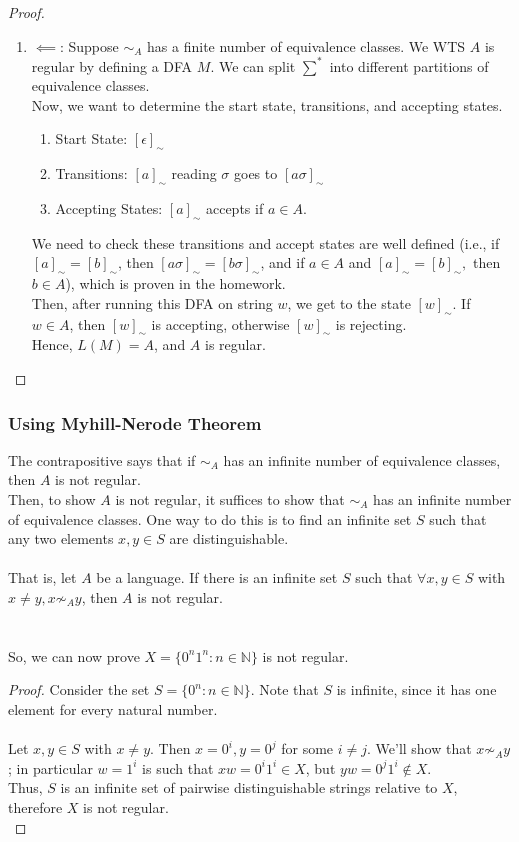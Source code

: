 \documentclass{article}
\begin{document}
\begin{proof}
\begin{enumerate}
        \item $\impliedby$: Suppose $\sim_A$ has a finite number of equivalence classes. We WTS $A$ is regular by defining a DFA $M$. We can split $\sum^*$ into different partitions of equivalence classes.\\
        Now, we want to determine the start state, transitions, and accepting states.
        \begin{enumerate}
            \item Start State: $[\epsilon]_\sim$
            \item Transitions: $[a]_\sim$ reading $\sigma$ goes to $[a\sigma]_\sim$
            \item Accepting States: $[a]_\sim$ accepts if $a \in A$.
        \end{enumerate}
        We need to check these transitions and accept states are well defined (i.e., if $[a]_\sim = [b]_\sim$, then $[a\sigma]_\sim = [b\sigma]_\sim$, and if $a \in A$ and $[a]_\sim = [b]_\sim,$ then $b \in A$), which is proven in the homework.\\
        Then, after running this DFA on string $w$, we get to the state $[w]_\sim$. If $w \in A$, then $[w]_\sim$ is accepting, otherwise $[w]_\sim$ is rejecting.\\
        Hence, $L(M) = A$, and $A$ is regular.
    \end{enumerate}
    \end{proof}
    
    \subsubsection{Using Myhill-Nerode Theorem}
    The contrapositive says that if $\sim_A$ has an infinite number of equivalence classes, then $A$ is not regular.\\
    Then, to show $A$ is not regular, it suffices to show that $\sim_A$ has an infinite number of equivalence classes. One way to do this is to find an infinite set $S$ such that any two elements $x,y \in S$ are distinguishable.\\
    \\
    That is, let $A$ be a language. If there is an infinite set $S$ such that $\forall x,y \in S$ with $x \neq y, x \not\sim_A y$, then $A$ is not regular.\\
    \\
    \\
    So, we can now prove $X = \{0^n1^n: n \in \mathbb{N}\}$ is not regular.
    \begin{proof}
    Consider the set $S = \{0^n: n \in \mathbb{N}\}$. Note that $S$ is infinite, since it has one element for every natural number.\\
    \\
    Let $x,y \in S$ with $x \neq y$. Then $x = 0^i, y = 0^j$ for some $i \neq j$. We'll show that $x \not\sim_A y$; in particular $w = 1^i$ is such that $xw = 0^i1^i \in X$, but $yw = 0^j1^i \not\in X$.\\
    Thus, $S$ is an infinite set of pairwise distinguishable strings relative to $X$, therefore $X$ is not regular.\\
    \end{proof}
    
\end{document}
